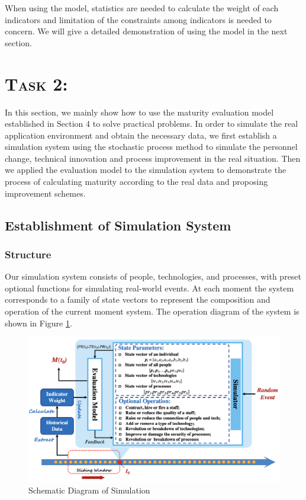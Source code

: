 \documentclass{mcmthesis}
\begin{document}
When using the model, statistics are needed to calculate the weight of each indicators and limitation of the constraints among indicators is needed to concern. We will give a detailed demonstration of using the model in the next section.

\section{\scshape{Task 2:} }
In this section, we mainly show how to use the maturity evaluation model established in Section 4 to solve practical problems. In order to simulate the real application environment and obtain the necessary data, we first establish a simulation system using the stochastic process method to simulate the personnel change, technical innovation and process improvement in the real situation. Then we applied the evaluation model to the simulation system to demonstrate the process of calculating maturity according to the real data and proposing improvement schemes.

\subsection{Establishment of Simulation System}

\subsubsection{Structure}
Our simulation system consists of people, technologies, and processes, with preset optional functions for simulating real-world events. At each moment the system corresponds to a family of state vectors to represent the composition and operation of the current moment system\cite{6}. The operation diagram of the system is shown in Figure \ref{figure::Schematic Diagram of Simulation}.

\begin{figure}[!htbp]
    \small
    \centering
    \includegraphics[width=15cm]{figures/simulation.png}
    \caption{Schematic Diagram of Simulation} 
    \label{figure::Schematic Diagram of Simulation}
\end{figure}%
\end{document}
